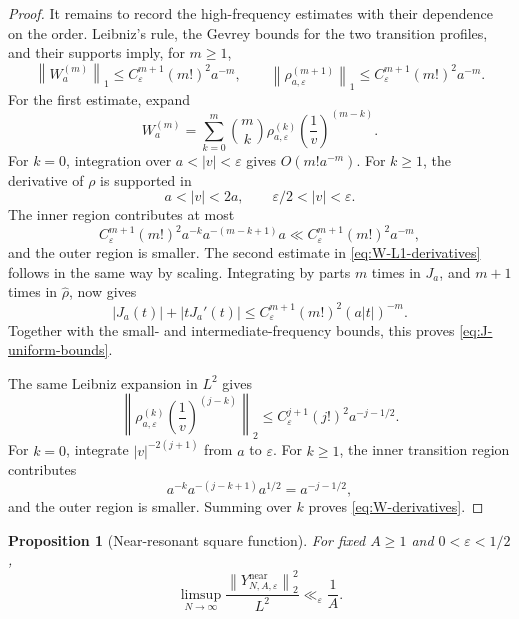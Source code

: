 \documentclass[11pt]{article}
\numberwithin{equation}{section}
\newtheorem{proposition}[theorem]{Proposition}
\theoremstyle{definition}
\newcommand{\1}{\mathbf 1}
\newcommand{\norm}[1]{\left\lVert#1\right\rVert}
\begin{document}
\begin{proof}
It remains to record the high-frequency estimates with their dependence
on the order.  Leibniz's rule, the Gevrey bounds for the two transition
profiles, and their supports imply, for \(m\ge1\),
\begin{equation}\label{eq:W-L1-derivatives}
 \norm{W_a^{(m)}}_1
 \le C_\varepsilon^{m+1}(m!)^2a^{-m},
 \qquad
 \norm{\rho_{a,\varepsilon}^{(m+1)}}_1
 \le C_\varepsilon^{m+1}(m!)^2a^{-m}.
\end{equation}
For the first estimate, expand
\[
 W_a^{(m)}
 =\sum_{k=0}^m
 \binom mk\rho_{a,\varepsilon}^{(k)}
 \left(\frac1v\right)^{(m-k)}.
\]
For \(k=0\), integration over \(a<|v|<\varepsilon\) gives
\(O(m!a^{-m})\).  For \(k\ge1\), the derivative of \(\rho\) is
supported in
\[
 a<|v|<2a,\qquad \varepsilon/2<|v|<\varepsilon.
\]
The inner region contributes at most
\[
 C_\varepsilon^{m+1}(m!)^2
 a^{-k}a^{-(m-k+1)}a
 \ll C_\varepsilon^{m+1}(m!)^2a^{-m},
\]
and the outer region is smaller.  The second estimate in
\eqref{eq:W-L1-derivatives} follows in the same way by scaling.
Integrating by parts \(m\) times in \(J_a\), and \(m+1\) times in
\(\widehat\rho\), now gives
\[
 |J_a(t)|+|tJ_a'(t)|
 \le C_\varepsilon^{m+1}(m!)^2(a|t|)^{-m}.
\]
Together with the small- and intermediate-frequency bounds, this proves
\eqref{eq:J-uniform-bounds}.

The same Leibniz expansion in \(L^2\) gives
\[
 \left\|
 \rho_{a,\varepsilon}^{(k)}
 \left(\frac1v\right)^{(j-k)}
 \right\|_2
 \le C_\varepsilon^{j+1}(j!)^2a^{-j-1/2}.
\]
For \(k=0\), integrate \(|v|^{-2(j+1)}\) from \(a\) to
\(\varepsilon\).  For \(k\ge1\), the inner transition region contributes
\[
 a^{-k}a^{-(j-k+1)}a^{1/2}=a^{-j-1/2},
\]
and the outer region is smaller.  Summing over \(k\) proves
\eqref{eq:W-derivatives}.
\end{proof}

\begin{proposition}[Near-resonant square function]\label{prop:near}
For fixed \(A\ge1\) and \(0<\varepsilon<1/2\),
\begin{equation}\label{eq:near}
 \limsup_{N\to\infty}
 \frac{\norm{Y^{\mathrm{near}}_{N,A,\varepsilon}}_2^2}{L^2}
 \ll_\varepsilon\frac1A.
\end{equation}
\end{proposition}
\end{document}
